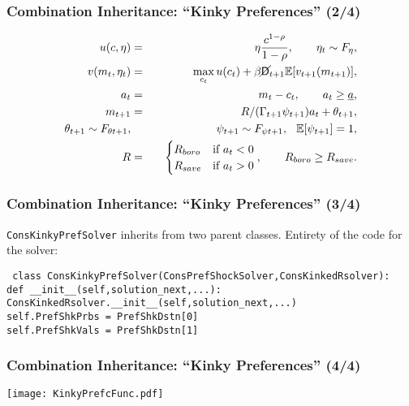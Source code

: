 \documentclass[11ptt]{beamer}
\begin{document}
\begin{frame}
  \frametitle{Combination Inheritance: ``Kinky Preferences'' (2/4)}
  \begin{eqnarray*}
    u(c,\eta) &=& \eta \frac{c^{1-\rho}}{1-\rho}, \qquad \eta_t \sim F_{\eta},\\
    v(m_t,\eta_t) &=& \max_{c_t} u(c_t) + \beta \cancel{\mathsf{D}}_{t+1} \mathbb{E} [v_{t+1}(m_{t+1}) ], \\
    a_t &=& m_t - c_t, \qquad a_t \geq \underline{a}, \\
    m_{t+1} &=& R/(\Gamma_{t+1} \psi_{t+1}) a_t + \theta_{t+1}, \\
    \theta_{t+1} \sim F_{\theta t+1}, &\qquad& \psi_{t+1} \sim F_{\psi t+1}, \hspace{0.25cm} \mathbb{E}[\psi_{t+1}] = 1, \\
    R &=& \begin{cases}
      R_{boro} & \text{if  } a_t < 0 \\
      R_{save} & \text{if  } a_t > 0
    \end{cases}, \qquad R_{boro} \geq R_{save}.
  \end{eqnarray*}
\end{frame}

\begin{frame}
  \frametitle{Combination Inheritance: ``Kinky Preferences'' (3/4)}
  \texttt{ConsKinkyPrefSolver} inherits from two parent classes.  Entirety of the code for the solver:

  \scriptsize{
    \texttt{
      class ConsKinkyPrefSolver(ConsPrefShockSolver,ConsKinkedRsolver):\\
      \qquad def \_\_init\_\_(self,solution\_next,...):\\
      \qquad \qquad ConsKinkedRsolver.\_\_init\_\_(self,solution\_next,...)\\
      \qquad \qquad self.PrefShkPrbs = PrefShkDstn[0]\\
      \qquad \qquad self.PrefShkVals = PrefShkDstn[1]\\
    }}
\end{frame}


\begin{frame}
  \frametitle{Combination Inheritance: ``Kinky Preferences'' (4/4)}
  \hyperlink{DiscussionTopics}{}

  \begin{center}
    \texttt{[image: KinkyPrefcFunc.pdf]}
  \end{center}

\end{frame}
\end{document}
